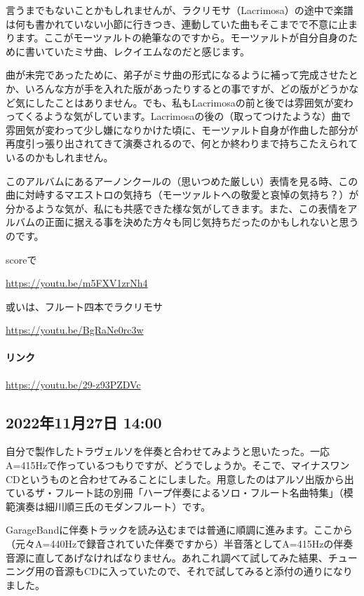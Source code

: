 言うまでもないことかもしれませんが、ラクリモサ（Lacrimosa）の途中で楽譜は何も書かれていない小節に行きつき、連動していた曲もそこまでで不意に止まります。ここがモーツァルトの絶筆なのですから。モーツァルトが自分自身のために書いていたミサ曲、レクイエムなのだと感じます。

曲が未完であったために、弟子がミサ曲の形式になるように補って完成させたとか、いろんな方が手を入れた版があったりするとの事ですが、どの版がどうかなど気にしたことはありません。でも、私もLacrimosaの前と後では雰囲気が変わってくるような気がしています。Lacrimosaの後の（取ってつけたような）曲で雰囲気が変わって少し嫌になりかけた頃に、モーツァルト自身が作曲した部分が再度引っ張り出されてきて演奏されるので、何とか終わりまで持ちこたえられているのかもしれません。

このアルバムにあるアーノンクールの（思いつめた厳しい）表情を見る時、この曲に対峙するマエストロの気持ち（モーツァルトへの敬愛と哀悼の気持ち？）が分かるような気が、私にも共感できた様な気がしてきます。また、この表情をアルバムの正面に据える事を決めた方々も同じ気持ちだったのかもしれないと思うのです。

scoreで

\url{https://youtu.be/m5FXV1zrNh4}

或いは、フルート四本でラクリモサ

\url{https://youtu.be/BgRaNe0rc3w}

\paragraph{リンク}
\url{https://youtu.be/29-z93PZDVc}

\subsection*{2022年11月27日 14:00}

自分で製作したトラヴェルソを伴奏と合わせてみようと思いたった。一応A=415Hzで作っているつもりですが、どうでしょうか。そこで、マイナスワンCDというものと合わせてみることにしました。用意したのはアルソ出版から出ているザ・フルート誌の別冊「ハープ伴奏によるソロ・フルート名曲特集」（模範演奏は細川順三氏のモダンフルート）です。

GarageBandに伴奏トラックを読み込むまでは普通に順調に進みます。ここから（元々A=440Hzで録音されていた伴奏ですから）半音落としてA=415Hzの伴奏音源に直してあげなければなりません。あれこれ調べて試してみた結果、チューニング用の音源もCDに入っていたので、それで試してみると添付の通りになりました。

